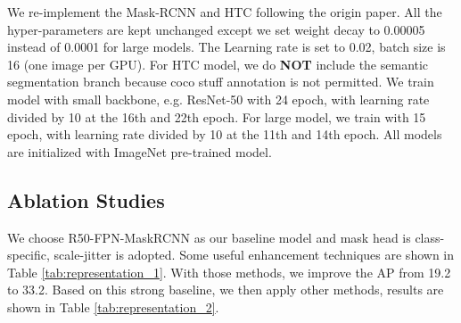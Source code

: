 \documentclass[runningheads]{llncs}
\begin{document}
We re-implement the Mask-RCNN \cite{He_2017_ICCV} and HTC \cite{chen2019hybrid} following the origin paper. All the hyper-parameters are kept unchanged except we set weight decay to 0.00005 instead of 0.0001 for large models. The Learning rate is set to 0.02, batch size is 16 (one image per GPU). For HTC  model, we do \textbf{NOT} include the semantic segmentation branch because coco stuff annotation is not permitted. We train model with small backbone, e.g. ResNet-50 \cite{he2016deep} with 24 epoch, with learning rate divided by 10 at the 16th and 22th epoch. For large model, we train with 15 epoch, with learning rate divided by 10 at the 11th and 14th epoch. All models are initialized with ImageNet pre-trained model. 
 
 \subsection{Ablation Studies}
 
 We choose R50-FPN-MaskRCNN \cite{He_2017_ICCV} as our baseline model and mask head is class-specific, scale-jitter is adopted. Some useful enhancement techniques are shown in Table \ref{tab:representation_1}. With those methods, we improve the AP from 19.2 to 33.2. Based on this strong baseline, we then apply other methods, results are shown in Table \ref{tab:representation_2}.
\end{document}
